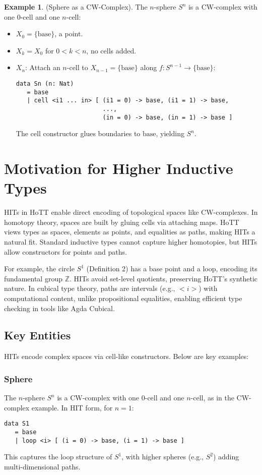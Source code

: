 \documentclass{article}
\theoremstyle{definition}
\newtheorem{example}{Example}
\begin{document}
\begin{example} (Sphere as a CW-Complex). The \( n \)-sphere
\( S^n \) is a CW-complex with one 0-cell and one \( n \)-cell:
\begin{itemize}
    \item \( X_0 = \{ \text{base} \} \), a point.
    \item \( X_k = X_0 \) for \( 0 < k < n \), no cells added.
    \item \( X_n \): Attach an \( n \)-cell to \( X_{n-1} =
      \{ \text{base} \} \) along \( f : S^{n-1} \to
      \{ \text{base} \} \):
    \begin{lstlisting}
data Sn (n: Nat)
   = base
   | cell <i1 ... in> [ (i1 = 0) -> base, (i1 = 1) -> base,
                        ...,
                        (in = 0) -> base, (in = 1) -> base ]
    \end{lstlisting}
    The \( \text{cell} \) constructor glues boundaries to
    \( \text{base} \), yielding \( S^n \).
\end{itemize}
\end{example}

\section{Motivation for Higher Inductive Types}
HITs in HoTT enable direct encoding of topological spaces like
CW-complexes. In homotopy theory, spaces are built by gluing
cells via attaching maps. HoTT views types as spaces, elements
as points, and equalities as paths, making HITs a natural fit.
Standard inductive types cannot capture higher homotopies, but
HITs allow constructors for points and paths.

For example, the circle \( S^1 \) (Definition 2) has a base
point and a loop, encoding its fundamental group
\( \mathbb{Z} \). HITs avoid set-level quotients, preserving
HoTT’s synthetic nature. In cubical type theory, paths are
intervals (e.g., \( <i> \)) with computational content, unlike
propositional equalities, enabling efficient type checking in
tools like Agda Cubical.

\subsection{Key Entities}
HITs encode complex spaces via cell-like constructors. Below
are key examples:

\subsubsection{Sphere}
The \( n \)-sphere \( S^n \) is a CW-complex with one 0-cell
and one \( n \)-cell, as in the CW-complex example. In HIT
form, for \( n=1 \):
\begin{lstlisting}
data S1
   = base
   | loop <i> [ (i = 0) -> base, (i = 1) -> base ]
\end{lstlisting}
This captures the loop structure of \( S^1 \), with higher
spheres (e.g., \( S^2 \)) adding multi-dimensional paths.
\end{document}
